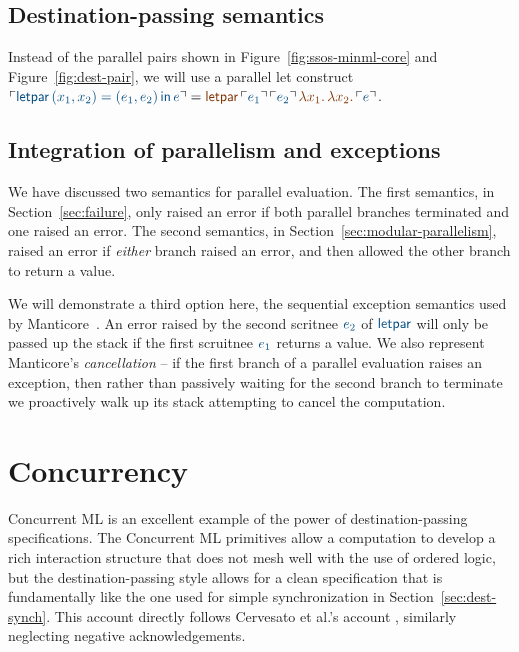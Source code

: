 \subsection{Destination-passing semantics}

Instead of the parallel pairs shown in
Figure~\ref{fig:ssos-minml-core} and Figure~\ref{fig:dest-pair}, we
will use a parallel let construct $\interp{{\sf letpar}\, (x_1,x_2) =
  (e_1,e_2) \,{\sf in}\,e} = \lf{{\sf
    letpar}\,\interp{e_1}\,\interp{e_2}\,\lambda x_1.\,\lambda
  x_2.\,\interp{e}}$.

\bigskip
{}

\subsection{Integration of parallelism and exceptions}

We have discussed two semantics for parallel evaluation. The first
semantics, in Section~\ref{sec:failure}, only raised an error if both
parallel branches terminated and one raised an error. The second
semantics, in Section~\ref{sec:modular-parallelism}, raised an error
if {\it either} branch raised an error, and then allowed the other
branch to return a value.

We will demonstrate a third option here, the sequential exception
semantics used by Manticore~\cite{fluet08scheduling}. An error raised
by the second scritnee $\obj{e_2}$ of $\obj{\sf letpar}$ will only be
passed up the stack if the first scruitnee $\obj{e_1}$ returns a
value. We also represent Manticore's {\it cancellation} -- if the
first branch of a parallel evaluation raises an exception, then rather
than passively waiting for the second branch to terminate we
proactively walk up its stack attempting to cancel the computation.

\bigskip
{}


\section{Concurrency}

Concurrent ML is an excellent example of the power of
destination-passing specifications. The Concurrent ML primitives allow
a computation to develop a rich interaction structure that does not
mesh well with the use of ordered logic, but the destination-passing
style allows for a clean specification that is fundamentally like the
one used for simple synchronization in
Section~\ref{sec:dest-synch}. This account directly follows Cervesato
et al.'s account \cite{cervesato02concurrent}, similarly neglecting
negative acknowledgements.


